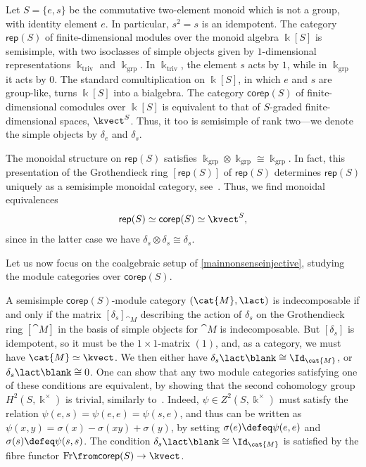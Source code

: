 Let \(S = \{e,s\}\) be the commutative two-element monoid which is not a group,
with identity element \(e\).
In particular, \(s^{2} = s\) is an idempotent.
The category \(\mathsf{rep}(S)\) of finite\hyp{}dimensional modules over the monoid algebra \(\Bbbk[S]\) is semisimple,
with two isoclasses of simple objects given by \(1\)\hyp{}dimensional representations \(\Bbbk_{\mathrm{triv}}\) and \(\Bbbk_{\mathrm{grp}}\).
In \(\Bbbk_{\mathrm{triv}}\), the element \(s\) acts by \(1\),
while in \(\Bbbk_{\mathrm{grp}}\) it acts by \(0\).
The standard comultiplication on \(\Bbbk[S]\), in which \(e\) and \(s\) are group-like, turns \(\Bbbk[S]\) into a bialgebra.
The category \(\mathsf{corep}(S)\) of finite\hyp{}dimensional comodules over \(\Bbbk[S]\) is equivalent to that of \(S\)\hyp{}graded finite\hyp{}dimensional spaces, \(\kvect^{S}\).
Thus, it too is semisimple of rank two—we denote the simple objects by \(\delta_{e}\) and \(\delta_{s}\).

The monoidal structure on \(\mathsf{rep}(S)\) satisfies \(\Bbbk_{\mathrm{grp}} \otimes \Bbbk_{\mathrm{grp}} \cong \Bbbk_{\mathrm{grp}}\).
In fact, this presentation of the Grothendieck ring \([\mathsf{rep}(S)]\) of \(\mathsf{rep}(S)\) determines \(\mathsf{rep}(S)\) uniquely as a semisimple monoidal category, see~\cite[Proposition~3.5]{sun23:notes}.
Thus, we find monoidal equivalences
\[
  \mathsf{rep}(S) \simeq \mathsf{corep}(S) \simeq \kvect^{S},
\]
since in the latter case we have \(\delta_{s} \otimes \delta_{s} \cong \delta_{s}\).

Let us now focus on the coalgebraic setup of \cref{mainnonsenseinjective},
studying the module categories over \(\mathsf{corep}(S)\).

A semisimple \(\mathsf{corep}(S)\)\hyp{}module category \((\cat{M}, \lact)\) is indecomposable
if and only if
the matrix \({[\delta_{s}]}_{\cat{M}}\)
describing the action of \(\delta_{s}\) on the Grothendieck ring \([\cat{M}]\) in the basis of simple objects for \(\cat{M}\)
is indecomposable.
But \([\delta_{s}]\) is idempotent, so it must be the \(1\times 1\)\hyp{}matrix \((1)\), and,
as a category, we must have \(\cat{M} \simeq \kvect\).
We then either have \(\delta_{s} \lact \blank \cong \Id_{\cat{M}}\),
or \(\delta_{s} \lact \blank \cong 0\).
One can show that any two module categories satisfying one of these conditions are equivalent,
by showing that the second cohomology group \(H^{2}(S, \Bbbk^{\times})\) is trivial,
similarly to~\cite[Example~7.4.10]{Etingof2015}.
Indeed, \(\psi \in Z^{2}(S, \Bbbk^{\times})\) must satisfy the relation \(\psi(e,s) = \psi(e,e) = \psi(s,e)\),
and thus can be written as \(\psi(x,y) = \sigma(x) - \sigma(xy) + \sigma(y)\),
by setting \(\sigma(e) \defeq \psi(e,e)\) and \(\sigma(s) \defeq \psi(s,s)\).
The condition \(\delta_{s} \lact \blank \cong \Id_{\cat{M}}\) is satisfied by the fibre functor
\(\mathrm{Fr}\from \mathsf{corep}(S) \to \kvect\).

